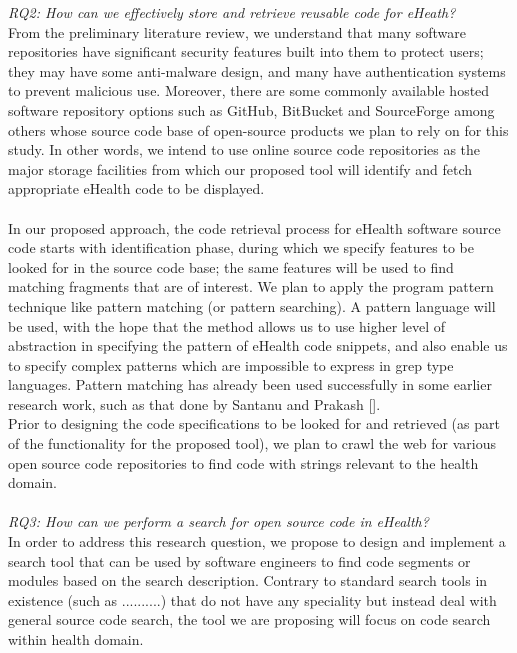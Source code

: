\documentclass[a4paper]{article}
\begin{document}
\textit{RQ2: How can we effectively store and retrieve reusable code for eHeath?} \\
From the preliminary literature review, we understand that many software repositories have significant security features built into them to protect users; they may have some anti-malware design, and many have authentication systems to prevent malicious use. Moreover, there are some commonly available hosted software repository options such as GitHub, BitBucket and SourceForge among others whose source code base of open-source products we plan to rely on for this study. In other words, we intend to use online source code repositories as the major storage facilities from which our proposed tool will identify and fetch appropriate eHealth code to be displayed. \\ \\
In our proposed approach, the code retrieval process for eHealth software source code starts with identification phase, during which we specify features to be looked for in the source code base; the same features will be used to find matching fragments that are of interest. We plan to apply the program pattern technique like pattern matching (or pattern searching). A pattern language will be used, with the hope that the method allows us to use higher level of abstraction in specifying the pattern of eHealth code snippets, and also enable us to specify complex patterns which are impossible to express in grep type languages. Pattern matching has already been used successfully in some earlier research work, such as that done by Santanu and Prakash []. \\
Prior to designing the code specifications to be looked for and retrieved (as part of the functionality for the proposed tool), we plan to crawl the web for various open source code repositories to find code with strings relevant to the health domain.\\ \\
\textit{RQ3: How can we perform a search for open source code in eHealth?} \\
In order to address this research question, we propose to design and implement a search tool that can be used by software engineers to find code segments or modules based on the search description. Contrary to standard  search tools in existence (such as ..........) that do not have any speciality but instead deal with general source code search, the tool we are proposing will focus on code search within health domain. \\
\end{document}
